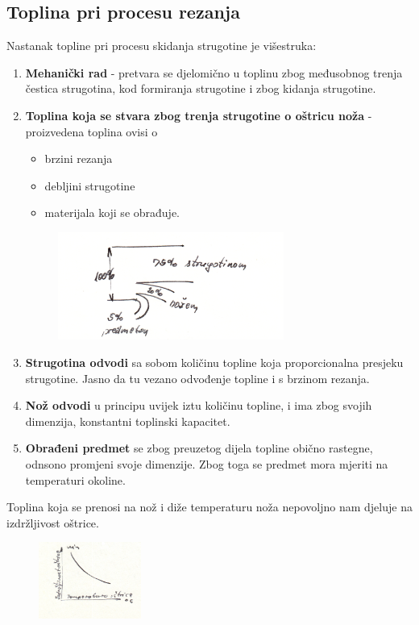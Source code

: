 \documentclass[a4paper,12pt]{article}
\numberwithin{figure}{section}
\begin{document}
\subsection{Toplina pri procesu rezanja}
Nastanak topline pri procesu skidanja strugotine je višestruka:
\begin{enumerate}
\item \textbf{Mehanički rad} - pretvara se djelomično u toplinu zbog međusobnog trenja čestica strugotina, kod formiranja strugotine i zbog kidanja strugotine.
\item \textbf{Toplina koja se stvara zbog trenja strugotine o oštricu noža} - proizvedena toplina ovisi o 
\begin{itemize}
\item brzini rezanja
\item debljini strugotine
\item materijala koji se obrađuje.
\end{itemize}
\begin{figure}[!h]
\includegraphics[width=0.7\textwidth]{image_11-1.png}
\end{figure}
\FloatBarrier
\item \textbf{Strugotina odvodi} sa sobom količinu topline koja proporcionalna presjeku strugotine. Jasno da tu vezano odvođenje topline i s brzinom rezanja.
\item \textbf{Nož odvodi} u principu uvijek iztu količinu topline, i ima zbog svojih dimenzija, konstantni toplinski kapacitet.
\item \textbf{Obrađeni predmet} se zbog preuzetog dijela topline obično rastegne, odnsono promjeni svoje dimenzije. Zbog toga se predmet mora mjeriti na temperaturi okoline.
\end{enumerate}
Toplina koja se prenosi na nož i diže temperaturu noža nepovoljno nam djeluje na izdržljivost oštrice.
\begin{figure}
\vspace{-0.5cm}
  \begin{center}
    \includegraphics[width=0.3\textwidth]{image_11-2.png}
  \end{center}
  \vspace{-1cm}
\end{figure}
\end{document}
